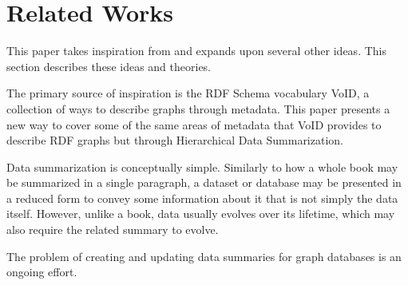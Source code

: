\section{Related Works}\label{sec:related-works}

This paper takes inspiration from and expands upon several other ideas. This section describes these ideas and theories.

The primary source of inspiration is the RDF Schema vocabulary VoID, a collection of ways to describe graphs through metadata. This paper presents a new way to cover some of the same areas of metadata that VoID provides to describe RDF graphs but through Hierarchical Data Summarization.

Data summarization is conceptually simple. Similarly to how a whole book may be summarized in a single paragraph, a dataset or database may be presented in a reduced form to convey some information about it that is not simply the data itself. However, unlike a book, data usually evolves over its lifetime, which may also require the related summary to evolve.

The problem of creating and updating data summaries for graph databases is an ongoing effort.